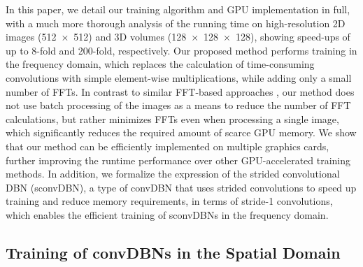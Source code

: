 In this paper, we detail our training algorithm and GPU implementation in full,
with a much more thorough analysis of the running time on high-resolution 2D
images (\num{512x512}) and 3D volumes (\num{128x128x128}), showing speed-ups of
up to 8-fold and 200-fold, respectively. Our proposed method performs training
in the frequency domain, which replaces the calculation of time-consuming
convolutions with simple element-wise multiplications, while adding only a small
number of FFTs. In contrast to similar FFT-based approaches
\citep[e.g.,][]{Mathieu2013}, our method does not use batch processing of the
images as a means to reduce the number of FFT calculations, but rather minimizes
FFTs even when processing a single image, which significantly reduces the
required amount of scarce GPU memory. We show that our method can be efficiently
implemented on multiple graphics cards, further improving the runtime
performance over other GPU-accelerated training methods. In addition, we
formalize the expression of the strided convolutional DBN (sconvDBN), a type of
convDBN that uses strided convolutions to speed up training and reduce memory
requirements, in terms of stride-1 convolutions, which enables the efficient
training of sconvDBNs in the frequency domain.



\subsection{Training of convDBNs in the Spatial Domain}


